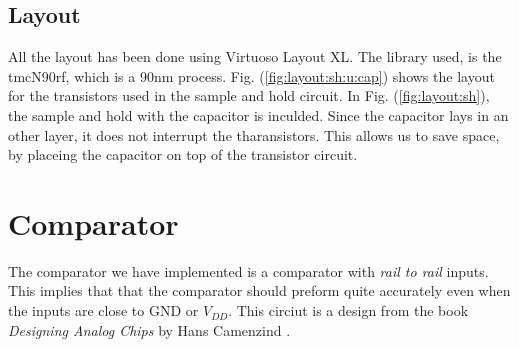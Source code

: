 \documentclass[english, 12pt, a4paper]{ifimaster}
\begin{document}
\subsection{Layout}
All the layout has been done using Virtuoso Layout XL. The library used, is the
tmcN90rf, which is a 90nm process. Fig. (\ref{fig:layout:sh:u:cap}) shows
the layout for the transistors used in the sample and hold circuit. In 
Fig. (\ref{fig:layout:sh}), the sample and hold with the capacitor is inculded. 
Since the capacitor lays in an other layer, it does not interrupt the tharansistors. 
This allows us to save space, by placeing the capacitor on top of the transistor circuit.

% 




\section{Comparator}
The comparator we have implemented is a comparator with \textit{rail to rail} inputs. This implies that that the comparator should preform quite accurately even when the inputs are close to 
GND or \(V_{DD}\). This circiut is a design from the book \textit{Designing Analog Chips} by Hans Camenzind \cite{hansc}.
\end{document}
